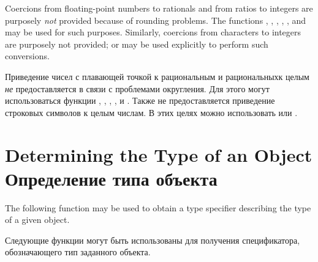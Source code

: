 \begin{defun}[Function]
Coercions from floating-point numbers to rationals and from ratios
to integers are purposely \emph{not} provided because of rounding
problems.  The functions , ,
, , , and  may be used for
such purposes.  Similarly, coercions from characters to integers
are purposely not provided;  or  may be
used explicitly to perform such conversions.

Приведение чисел с плавающей точкой к рациональным и рациональныхк целым
\emph{не} предоставляется в связи с проблемами округления. Для этого могут
использоваться функции , ,
, ,  и . Также не предоставляется
приведение строковых символов к целым числам. В этих целях можно использовать
 или .
\end{defun}

\section{Determining the Type of an Object Определение типа объекта}

The following function may be used to obtain a type specifier
describing the type of a given object.

Следующие функции могут быть использованы для получения спецификатора,
обозначающего тип заданного объекта.

